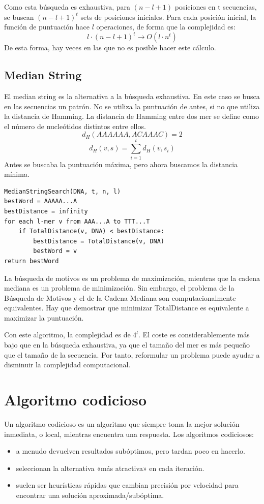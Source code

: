 Como esta búsqueda es exhaustiva, para $(n - l + 1)$ posiciones en t secuencias, se buscan $(n - l + 1)^t$ sets de posiciones iniciales. Para cada posición inicial, la función de puntuación hace $l$ operaciones, de forma que la complejidad es:
$$l \cdot (n - l + 1)^t \rightarrow O(l \cdot n^t)$$
De esta forma, hay veces en las que no es posible hacer este cálculo.

\subsection{Median String}
El median string es la alternativa a la búsqueda exhaustiva. En este caso se busca en las secuencias un patrón. No se utiliza la puntuación de antes, si no que utiliza la distancia de Hamming. La distancia de Hamming entre dos mer se define como el número de nucleótidos distintos entre ellos. 
$$d_H(AAAAAA, ACAAAC) = 2$$
$$d_H(v, s) = \sum^t_{i = 1} d_H(v, s_i)$$
Antes se buscaba la puntuación máxima, pero ahora buscamos la distancia mínima. 

\begin{lstlisting}
MedianStringSearch(DNA, t, n, l)
bestWord = AAAAA...A
bestDistance = infinity
for each l-mer v from AAA...A to TTT...T
	if TotalDistance(v, DNA) < bestDistance:
		bestDistance = TotalDistance(v, DNA)
		bestWord = v
return bestWord
\end{lstlisting}

La búsqueda de motivos es un problema de maximización, mientras que la cadena mediana es un problema de minimización. Sin embargo, el problema de la Búsqueda de Motivos y el de la Cadena Mediana son computacionalmente equivalentes. Hay que demostrar que minimizar TotalDistance es equivalente a maximizar la puntuación.

Con este algoritmo, la complejidad es de $4^l$. El coste es considerablemente más bajo que en la búsqueda exhaustiva, ya que el tamaño del mer es más pequeño que el tamaño de la secuencia. Por tanto, reformular un problema puede ayudar a disminuir la complejidad computacional. 

\section{Algoritmo codicioso}
Un algoritmo codicioso es un algoritmo que siempre toma la mejor solución inmediata, o local, mientras encuentra una respuesta.
Los algoritmos codiciosos:
\begin{itemize}
\item a menudo devuelven resultados subóptimos, pero tardan poco en hacerlo.
\item seleccionan la alternativa «más atractiva» en cada iteración.
\item suelen ser heurísticas rápidas que cambian precisión por velocidad para encontrar una solución aproximada/subóptima.
\end{itemize}

